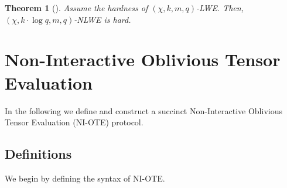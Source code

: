 \documentclass{article}
\newtheorem{theorem}{Theorem}\newtheorem{lemma}[theorem]{Lemma}\newtheorem{proposition}[theorem]{Proposition}\newtheorem{corollary}[theorem]{Corollary}\newtheorem{definition}[theorem]{Definition}\newtheorem{claim}[theorem]{Claim}
\newcommand{\seclab}[1]{\label{sec:#1}}
\begin{document}
\begin{theorem}[\cite{C:BLMR13}]
    Assume the hardness of $(\chi, k, m, q)$-LWE. Then, $(\chi, k\cdot \log q, m, q)$-NLWE is hard.
\end{theorem}




\section{Non-Interactive Oblivious Tensor Evaluation}

In the following we define and construct a succinct Non-Interactive Oblivious Tensor Evaluation (NI-OTE) protocol.


\subsection{Definitions} \label{defOTE}

We begin by defining the syntax of NI-OTE.
\end{document}
